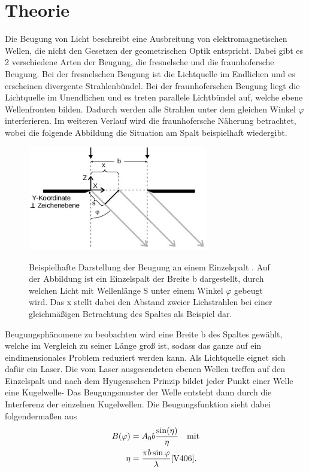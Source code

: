 \section{Theorie}
Die Beugung von Licht beschreibt eine Ausbreitung von elektromagnetischen Wellen,
die nicht den Gesetzen der geometrischen Optik entspricht. Dabei gibt es 2 verschiedene
Arten der Beugung, die fresnelsche und die fraunhofersche Beugung. Bei der fresnelschen
Beugung ist die Lichtquelle im Endlichen und es erscheinen divergente Strahlenbündel.
Bei der fraunhoferschen Beugung  liegt die Lichtquelle im Unendlichen und es treten
parallele Lichtbündel auf, welche ebene Wellenfronten bilden. Dadurch werden alle
Strahlen unter dem gleichen Winkel $\varphi$ interferieren. Im weiteren Verlauf  wird
die fraunhofersche Näherung betrachtet, wobei die folgende Abbildung die Situation am Spalt 
beispielhaft wiedergibt.
\begin{figure}[H]
    \centering
    \includegraphics[width=0.7\textwidth]{images/spalt.jpg}
    \label{fig:1}
    \caption{Beispielhafte Darstellung der Beugung an einem Einzelspalt \cite{V406}.
    Auf der Abbildung ist ein Einzelspalt der Breite b dargestellt, durch welchen 
    Licht mit Wellenlänge S unter einem Winkel $\varphi$ gebeugt wird. Das x stellt dabei
    den Abstand zweier Lichstrahlen bei einer gleichmäßigen Betrachtung des Spaltes als Beispiel dar.
    }
\end{figure}
\justifying Beugungsphänomene zu beobachten wird eine  Breite b des Spaltes gewählt, welche  im Vergleich zu
seiner Länge groß ist, sodass das ganze auf ein eindimensionales Problem reduziert werden kann.
Als Lichtquelle eignet sich dafür ein Laser. Die vom Laser ausgesendeten ebenen Wellen
treffen auf den Einzelspalt und nach dem Hyugenschen Prinzip bildet jeder Punkt einer Welle
eine Kugelwelle- Das Beugungsmuster der Welle entsteht dann durch die Interferenz der einzelnen
Kugelwellen. Die Beugungsfunktion sieht dabei folgendermaßen aus
\begin{align}
    B(\varphi) &= A_0 b \frac{\sin (\eta)}{\eta}  \label{eq:1} \quad \text{mit}\\
    \eta &= \frac{\pi b \sin \varphi}{\lambda} \label{eq:2} \text{\cite{V406}} .
\end{align}
